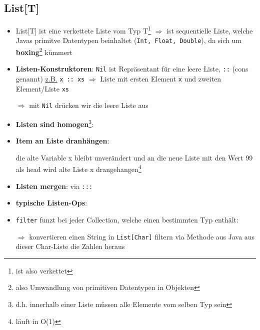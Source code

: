 \subsection{List[T]}
\begin{itemize}
  \item List[T] ist eine verkettete Liste vom 
  Typ T\footnote{ist also verkettet} $\Rightarrow$ ist sequentielle Liste,
  welche Javas primitve Datentypen beinhaltet (\texttt{Int, Float,
  Double}), da sich um 
  \textbf{boxing}\footnote{also Umwandlung von primitiven Datentypen in
  Objekten} kümmert
  \item \textbf{Listen-Konstruktoren}: \texttt{Nil} ist Repräsentant für
  eine leere Liste, \texttt{::} (cons genannt) \uline{z.B.} 
  \texttt{x :: xs} $\Rightarrow$ Liste mit ersten Element \texttt{x}
  und zweiten Element/Liste \texttt{xs}
  
  
  
  $\Rightarrow$ mit \texttt{Nil} drücken wir die leere Liste aus
  \item \textbf{Listen sind homogen}\footnote{d.h. innerhalb einer Liste
  müssen alle Elemente vom selben Typ sein}:
  
  
  
  \item \textbf{Item an Liste dranhängen}:
  
  
  
  die alte Variable x bleibt unverändert und an die neue Liste mit den Wert
  99 als head wird alte Liste x drangehangen\footnote{läuft in O(1)}
  \item \textbf{Listen mergen}: via \texttt{:::}
  
  
  
  \item \textbf{typische Listen-Ops}:
  
  
  
  \item \texttt{filter} funzt bei jeder Collection, welche einen
  bestimmten Typ enthält:
  
  
  
  $\Rightarrow$ konvertieren einen String in \texttt{List[Char]} \und 
  filtern via Methode aus Java aus dieser Char-Liste die Zahlen heraus
\end{itemize}


